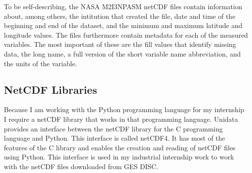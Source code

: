 \documentclass[../00_main.tex]{subfiles}
\begin{document}
To be self-describing, the NASA M2I3NPASM netCDF files contain information
about, among others, the intitution that created the file, date and time of the
beginning and end of the dataset, and the minimum and maximum latitude and
longitude values. 
The files furthermore contain metadata for each of the
measured variables. The most important of these are the fill values
that identify missing data, the long name, a full version 
of the short variable name abbreviation, and the units of the variable.

\subsection{NetCDF Libraries}

Because I am working with the Python programming language for my internship
I require a netCDF library that works in that programming language. Unidata
provides an interface between the netCDF library for the C programming language
and Python. This interface is called netCDF4. It has most of the features of
the C library and enables the creation and reading of netCDF files using
Python. This interface is used in my industrial internship work to work with
the netCDF files downloaded from GES DISC.
\end{document}
